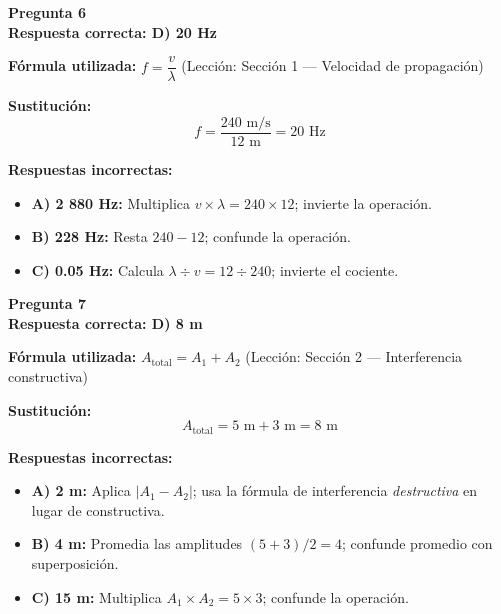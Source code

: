 \begin{respuestabox}
\textbf{Pregunta 6}\\
\textcolor{verdecorrecto}{\textbf{Respuesta correcta: D) 20 Hz}}

\textbf{Fórmula utilizada:} $f = \dfrac{v}{\lambda}$ (Lección: Sección 1 — Velocidad de propagación)

\textbf{Sustitución:}
$$f = \frac{240 \text{ m/s}}{12 \text{ m}} = 20 \text{ Hz}$$

\textbf{Respuestas incorrectas:}
\begin{itemize}
    \item \textbf{A) 2 880 Hz:} Multiplica $v \times \lambda = 240 \times 12$; invierte la operación.
    \item \textbf{B) 228 Hz:} Resta $240 - 12$; confunde la operación.
    \item \textbf{C) 0.05 Hz:} Calcula $\lambda \div v = 12 \div 240$; invierte el cociente.
\end{itemize}
\end{respuestabox}

\begin{respuestabox}
\textbf{Pregunta 7}\\
\textcolor{verdecorrecto}{\textbf{Respuesta correcta: D) 8 m}}

\textbf{Fórmula utilizada:} $A_{\text{total}} = A_1 + A_2$ (Lección: Sección 2 — Interferencia constructiva)

\textbf{Sustitución:}
$$A_{\text{total}} = 5 \text{ m} + 3 \text{ m} = 8 \text{ m}$$

\textbf{Respuestas incorrectas:}
\begin{itemize}
    \item \textbf{A) 2 m:} Aplica $|A_1 - A_2|$; usa la fórmula de interferencia \textit{destructiva} en lugar de constructiva.
    \item \textbf{B) 4 m:} Promedia las amplitudes $(5+3)/2 = 4$; confunde promedio con superposición.
    \item \textbf{C) 15 m:} Multiplica $A_1 \times A_2 = 5 \times 3$; confunde la operación.
\end{itemize}
\end{respuestabox}

